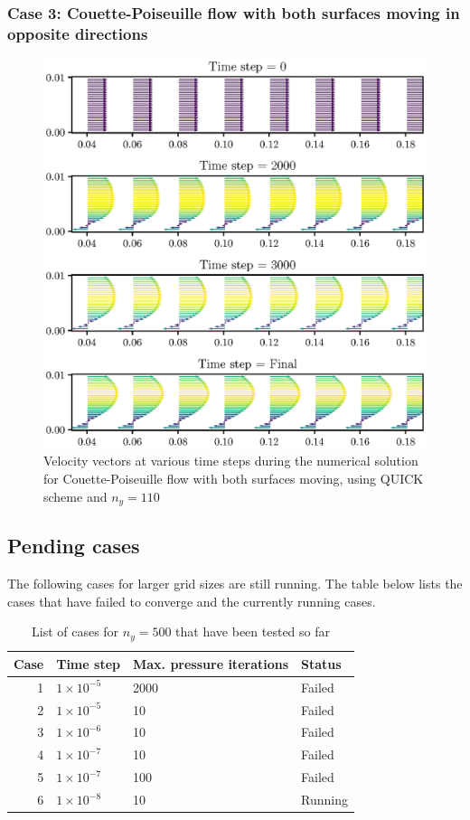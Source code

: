 \documentclass[12pt,a4paper,fleqn]{article}
\begin{document}
\subsubsection{Case 3: Couette-Poiseuille flow with both surfaces moving in opposite directions}
\begin{figure}[H]
  \centering
  \includegraphics[width=\linewidth]{navierFVD-velocityVectors-couette-poiseuille02}
  \caption{Velocity vectors at various time steps during the numerical solution for Couette-Poiseuille flow with both surfaces moving, using QUICK scheme and $n_y = 110$}
\end{figure}
\pagebreak

\subsection{Pending cases}
The following cases for larger grid sizes are still running. The table below lists the cases that have failed to converge and the currently running cases.

\begin{table}[H]
\caption{List of cases for $n_y=500$ that have been tested so far}
\centering
\begin{tabular}{|r|l|l|l|}
\hline
Case & Time step & Max. pressure iterations & Status\\
\hline
\noalign{\smallskip}
1	& $1\times10^{-5}$	& 2000 & Failed\\
2	& $1\times10^{-5}$	& 10 & Failed\\
3	& $1\times10^{-6}$	& 10 & Failed\\
4	& $1\times10^{-7}$	& 10 & Failed\\
5	& $1\times10^{-7}$	& 100 & Failed\\
6	& $1\times10^{-8}$	& 10 & Running\\
\hline
\end{tabular}

\label{table:pending-cases}
\end{table}
\end{document}

